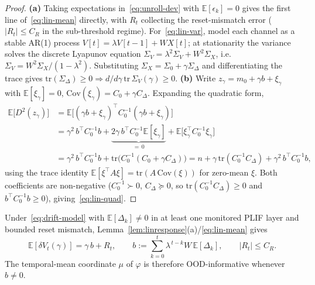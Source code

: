 ﻿\documentclass{article} %
\theoremstyle{remark}
\begin{document}
\begin{proof}
\textbf{(a)} Taking expectations in~\eqref{eq:unroll-dev} with $\mathbb{E}[\epsilon_k]=0$ gives the
first line of~\eqref{eq:lin-mean} directly, with $R_t$ collecting the reset-mismatch error
($|R_t|\le C_R$ in the sub-threshold regime). For~\eqref{eq:lin-var}, model each channel as a stable
AR(1) process $V[t]=\lambda V[t-1]+WX[t]$; at stationarity the variance solves the discrete Lyapunov
equation $\Sigma_V=\lambda^2\Sigma_V+W^2\Sigma_X$, i.e.\ $\Sigma_V=W^2\Sigma_X/(1-\lambda^2)$.
Substituting $\Sigma_X=\Sigma_0+\gamma\Sigma_\Delta$ and differentiating the trace gives
$\mathrm{tr}(\Sigma_\Delta)\ge0\Rightarrow d/d\gamma\,\mathrm{tr}\,\Sigma_V(\gamma)\ge0$.
\textbf{(b)} Write $z_\gamma=m_0+\gamma b+\xi_\gamma$ with $\mathbb{E}[\xi_\gamma]=0$,
$\mathrm{Cov}(\xi_\gamma)=C_0+\gamma C_\Delta$. Expanding the quadratic form,
\begin{align*}
  \mathbb{E}\bigl[D^2(z_\gamma)\bigr]
  &= \mathbb{E}\bigl[(\gamma b+\xi_\gamma)^\top C_0^{-1}(\gamma b+\xi_\gamma)\bigr] \\
  &= \gamma^2\,b^\top C_0^{-1}b + \underbrace{2\gamma\,b^\top C_0^{-1}\mathbb{E}[\xi_\gamma]}_{=\,0}
     + \mathbb{E}\bigl[\xi_\gamma^\top C_0^{-1}\xi_\gamma\bigr] \\
  &= \gamma^2\,b^\top C_0^{-1}b + \mathrm{tr}\bigl(C_0^{-1}(C_0+\gamma C_\Delta)\bigr)
   = n + \gamma\,\mathrm{tr}(C_0^{-1}C_\Delta) + \gamma^2\,b^\top C_0^{-1}b,
\end{align*}
using the trace identity $\mathbb{E}[\xi^\top A\xi]=\mathrm{tr}(A\,\mathrm{Cov}(\xi))$ for zero-mean
$\xi$. Both coefficients are non-negative ($C_0^{-1}\succ0$, $C_\Delta\succeq0$, so
$\mathrm{tr}(C_0^{-1}C_\Delta)\ge0$ and $b^\top C_0^{-1}b\ge0$), giving~\eqref{eq:lin-quad}.
\end{proof}

\begin{corollary}
\label{thm:drift}
Under~\eqref{eq:drift-model} with $\mathbb{E}[\Delta_k]\neq0$ in at least one monitored PLIF layer
and bounded reset mismatch, Lemma~\ref{lem:linresponse}(a)/\eqref{eq:lin-mean} gives
\begin{equation}
  \mathbb{E}[\delta V_t(\gamma)] = \gamma\,b + R_t, \qquad
  b := \sum_{k=0}^{t}\lambda^{\,t-k}W\,\mathbb{E}[\Delta_k], \qquad |R_t|\le C_R.
  \label{eq:drift-result}
\end{equation}
The temporal-mean coordinate $\mu$ of $\varphi$ is therefore OOD-informative whenever $b\neq0$.
\end{corollary}
\end{document}
